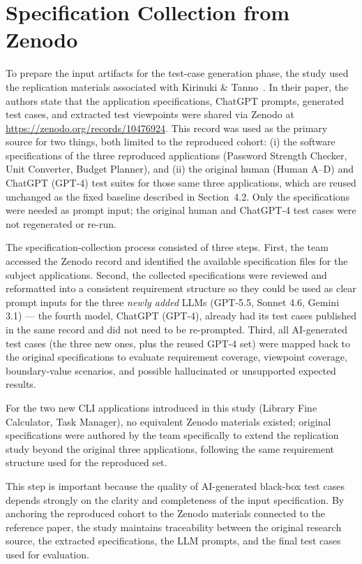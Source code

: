 \documentclass[12pt,a4paper]{article}
\begin{document}
\section{Specification Collection from Zenodo}
\label{sec:zenodo}

To prepare the input artifacts for the test-case generation phase, the study used the replication materials associated with Kirinuki \& Tanno~\cite{b1}. In their paper, the authors state that the application specifications, ChatGPT prompts, generated test cases, and extracted test viewpoints were shared via Zenodo at \url{https://zenodo.org/records/10476924}. This record was used as the primary source for two things, both limited to the reproduced cohort: (i) the software specifications of the three reproduced applications (Password Strength Checker, Unit Converter, Budget Planner), and (ii) the original human (Human A--D) and ChatGPT (GPT-4) test suites for those same three applications, which are reused unchanged as the fixed baseline described in Section~4.2. Only the specifications were needed as prompt input; the original human and ChatGPT-4 test cases were not regenerated or re-run.

The specification-collection process consisted of three steps. First, the team accessed the Zenodo record and identified the available specification files for the subject applications. Second, the collected specifications were reviewed and reformatted into a consistent requirement structure so they could be used as clear prompt inputs for the three \emph{newly added} LLMs (GPT-5.5, Sonnet 4.6, Gemini 3.1) --- the fourth model, ChatGPT (GPT-4), already had its test cases published in the same record and did not need to be re-prompted. Third, all AI-generated test cases (the three new ones, plus the reused GPT-4 set) were mapped back to the original specifications to evaluate requirement coverage, viewpoint coverage, boundary-value scenarios, and possible hallucinated or unsupported expected results.

For the two new CLI applications introduced in this study (Library Fine Calculator, Task Manager), no equivalent Zenodo materials existed; original specifications were authored by the team specifically to extend the replication study beyond the original three applications, following the same requirement structure used for the reproduced set.

This step is important because the quality of AI-generated black-box test cases depends strongly on the clarity and completeness of the input specification. By anchoring the reproduced cohort to the Zenodo materials connected to the reference paper, the study maintains traceability between the original research source, the extracted specifications, the LLM prompts, and the final test cases used for evaluation.
\end{document}
